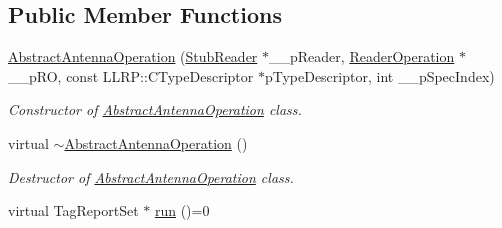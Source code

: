 \subsection*{Public Member Functions}
\begin{DoxyCompactItemize}
\item 
\hyperlink{class_e_l_f_i_n_1_1_abstract_antenna_operation_acbea0c1638717adb99062f3bc49c970e}{Abstract\-Antenna\-Operation} (\hyperlink{class_e_l_f_i_n_1_1_stub_reader}{Stub\-Reader} $\ast$\-\_\-\-\_\-p\-Reader, \hyperlink{class_e_l_f_i_n_1_1_reader_operation}{Reader\-Operation} $\ast$\-\_\-\-\_\-p\-R\-O, const L\-L\-R\-P\-::\-C\-Type\-Descriptor $\ast$p\-Type\-Descriptor, int \-\_\-\-\_\-p\-Spec\-Index)
\begin{DoxyCompactList}\small\item\em Constructor of \hyperlink{class_e_l_f_i_n_1_1_abstract_antenna_operation}{Abstract\-Antenna\-Operation} class. \end{DoxyCompactList}\item 
virtual \hyperlink{class_e_l_f_i_n_1_1_abstract_antenna_operation_a6c23f620e5d8c3831e584940c9cc8772}{$\sim$\-Abstract\-Antenna\-Operation} ()
\begin{DoxyCompactList}\small\item\em Destructor of \hyperlink{class_e_l_f_i_n_1_1_abstract_antenna_operation}{Abstract\-Antenna\-Operation} class. \end{DoxyCompactList}\item 
virtual Tag\-Report\-Set $\ast$ \hyperlink{class_e_l_f_i_n_1_1_abstract_antenna_operation_af8cd8a5e57d157a3af20c28c6e573bfb}{run} ()=0
\end{DoxyCompactItemize}
